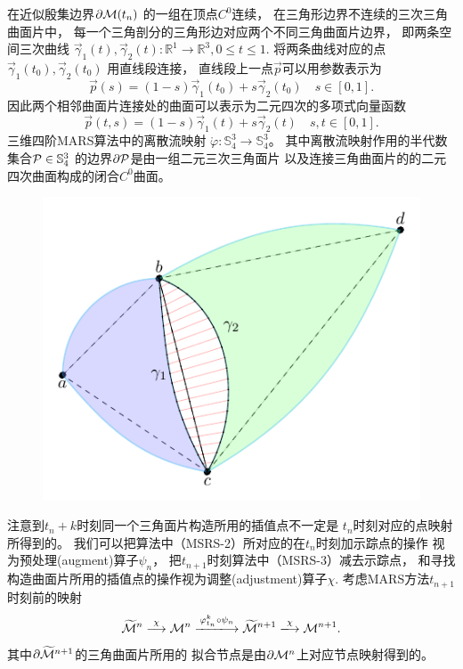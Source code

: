 \begin{rem}
  在近似殷集边界$\partial {\cal M}(t_n)$
  的一组在顶点$C^0$连续，
  在三角形边界不连续的三次三角曲面片中，
  每一个三角剖分的三角形边对应两个不同三角曲面片边界，
  即两条空间三次曲线
  $\vec{\gamma}_1(t),\vec{\gamma}_2(t)
  : \mathbb{R}^1\rightarrow \mathbb{R}^3,
  0\leq t\leq 1.$
  将两条曲线对应的点$\vec{\gamma}_1(t_0),\vec{\gamma}_2(t_0)$
  用直线段连接，
  直线段上一点$\vec{p}$可以用参数表示为
  \begin{displaymath}
    \vec{p}(s)=(1-s)\vec{\gamma}_1(t_0)+s\vec{\gamma}_2(t_0)
    \quad s\in [0,1].
  \end{displaymath}
  因此两个相邻曲面片连接处的曲面可以表示为二元四次的多项式向量函数
    \begin{displaymath}
    \vec{p}(t,s)=(1-s)\vec{\gamma}_1(t)+s\vec{\gamma}_2(t)
    \quad s,t\in [0,1].
  \end{displaymath}
  三维四阶MARS算法中的离散流映射
  $\mathring{\varphi}:\mathbb{S}^3_4\rightarrow \mathbb{S}^3_4 $。
  其中离散流映射作用的半代数集合${\cal P}\in \mathbb{S}^3_4$
  的边界$\partial {\cal P}$是由一组二元三次三角面片
  以及连接三角曲面片的的二元四次曲面构成的闭合$C^0$曲面。
\end{rem}

\begin{figure}[H]
    \centering
    \includegraphics[width=0.3\linewidth]{tikz/connectSurface}
    \label{fig:connect}
  \end{figure}

\begin{rem}
  注意到$t_n+k$时刻同一个三角面片构造所用的插值点不一定是
  $t_n$时刻对应的点映射所得到的。
  我们可以把算法中（MSRS-2）所对应的在$t_n$时刻加示踪点的操作
  视为预处理(augment)算子$\psi_n$，
  把$t_{n+1}$时刻算法中（MSRS-3）减去示踪点，
  和寻找构造曲面片所用的插值点的操作视为调整(adjustment)算子$\chi.$
  考虑MARS方法$t_{n+1}$时刻前的映射
  \begin{equation}
    \widetilde{{\cal M}}^n\stackrel{\chi}{\longrightarrow}
    {\cal M}^n\xlongrightarrow{\varphi_{t_n}^k\circ\psi_n}
    \widetilde{{\cal M}}^{n+1}\xlongrightarrow{\chi}{\cal M}^{n+1}.
  \end{equation}
  其中$\partial\widetilde{{\cal M}}^{n+1}$的三角曲面片所用的
  拟合节点是由$\partial {\cal M}^n$上对应节点映射得到的。
\end{rem}
